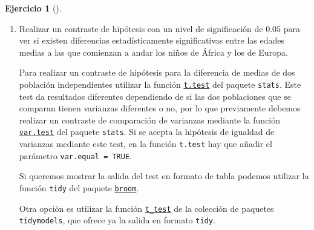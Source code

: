 \documentclass[
  a4paper,
]{scrreport}
\theoremstyle{definition}
\newtheorem{exercise}{Ejercicio}[chapter]
\theoremstyle{remark}
\begin{document}
\begin{exercise}[]
\begin{enumerate}
\begin{tcolorbox}
  \end{tcolorbox}
\item
  Realizar un contraste de hipótesis con un nivel de significación de
  \(0.05\) para ver si existen diferencias estadísticamente
  significativas entre las edades medias a las que comienzan a andar los
  niños de África y los de Europa.

  \begin{tcolorbox}[enhanced jigsaw, coltitle=black, left=2mm, colback=white, leftrule=.75mm, toptitle=1mm, breakable, bottomrule=.15mm, titlerule=0mm, bottomtitle=1mm, title=\textcolor{quarto-callout-note-color}{\faInfo}\hspace{0.5em}{Ayuda}, arc=.35mm, toprule=.15mm, rightrule=.15mm, colframe=quarto-callout-note-color-frame, opacityback=0, colbacktitle=quarto-callout-note-color!10!white, opacitybacktitle=0.6]

  Para realizar un contraste de hipótesis para la diferencia de medias
  de dos población independientes utilizar la función
  \href{https://www.rdocumentation.org/packages/stats/versions/3.6.2/topics/t.test}{\texttt{t.test}}
  del paquete \texttt{stats}. Este test da resultados diferentes
  dependiendo de si las dos poblaciones que se comparan tienen varianzas
  diferentes o no, por lo que previamente debemos realizar un contraste
  de comparación de varianzas mediante la función
  \href{https://www.rdocumentation.org/packages/stats/versions/3.6.2/topics/var.test}{\texttt{var.test}}
  del paquete \texttt{stats}. Si se acepta la hipótesis de igualdad de
  varianzas mediante este test, en la función \texttt{t.test} hay que
  añadir el parámetro \texttt{var.equal\ =\ TRUE}.

  Si queremos mostrar la salida del test en formato de tabla podemos
  utilizar la función \texttt{tidy} del paquete
  \href{https://broom.tidymodels.org/index.html}{\texttt{broom}}.

  Otra opción es utilizar la función
  \href{https://infer.tidymodels.org/reference/t_test.html}{\texttt{t\_test}}
  de la colección de paquetes \texttt{tidymodels}, que ofrece ya la
  salida en formato \texttt{tidy}.

  \end{tcolorbox}

  \begin{tcolorbox}[enhanced jigsaw, coltitle=black, left=2mm, colback=white, leftrule=.75mm, toptitle=1mm, breakable, bottomrule=.15mm, titlerule=0mm, bottomtitle=1mm, title=\textcolor{quarto-callout-tip-color}{\faLightbulb}\hspace{0.5em}{Solución}, arc=.35mm, toprule=.15mm, rightrule=.15mm, colframe=quarto-callout-tip-color-frame, opacityback=0, colbacktitle=quarto-callout-tip-color!10!white, opacitybacktitle=0.6]


\end{tcolorbox}
\end{enumerate}
\end{exercise}
\end{document}
